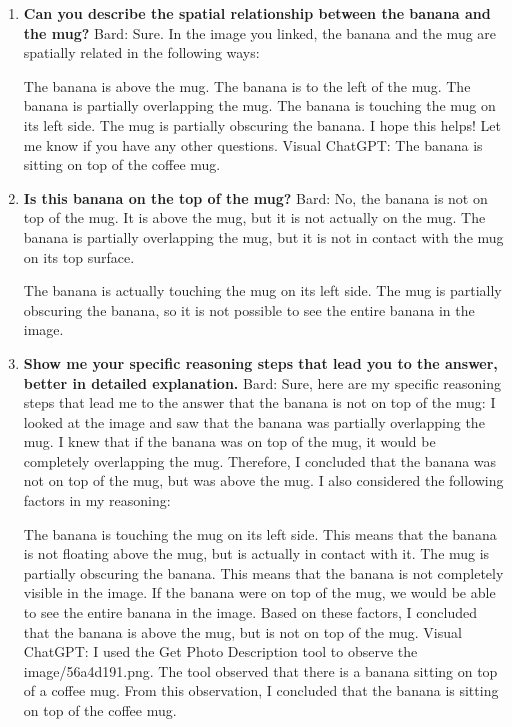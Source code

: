    \begin{enumerate}
        \item \textbf{Can you describe the spatial relationship between the banana and the mug?}
        \subitem Bard: Sure. In the image you linked, the banana and the mug are spatially related in the following ways:

        The banana is above the mug.
        The banana is to the left of the mug.
        The banana is partially overlapping the mug.
        The banana is touching the mug on its left side.
        The mug is partially obscuring the banana.
        I hope this helps! Let me know if you have any other questions.
        \subitem Visual ChatGPT: The banana is sitting on top of the coffee mug.
        \item \textbf{Is this banana on the top of the mug?}
        \subitem Bard: 
        No, the banana is not on top of the mug. It is above the mug, but it is not actually on the mug. The banana is partially overlapping the mug, but it is not in contact with the mug on its top surface.
        
        The banana is actually touching the mug on its left side. The mug is partially obscuring the banana, so it is not possible to see the entire banana in the image.
        \item \textbf{Show me your specific reasoning steps that lead you to the answer, better in detailed explanation.}
        \subitem Bard: 
        Sure, here are my specific reasoning steps that lead me to the answer that the banana is not on top of the mug:
        I looked at the image and saw that the banana was partially overlapping the mug.
        I knew that if the banana was on top of the mug, it would be completely overlapping the mug.
        Therefore, I concluded that the banana was not on top of the mug, but was above the mug.
        I also considered the following factors in my reasoning:

        The banana is touching the mug on its left side. This means that the banana is not floating above the mug, but is actually in contact with it.
        The mug is partially obscuring the banana. This means that the banana is not completely visible in the image. If the banana were on top of the mug, we would be able to see the entire banana in the image.
        Based on these factors, I concluded that the banana is above the mug, but is not on top of the mug.
        \subitem Visual ChatGPT: I used the Get Photo Description tool to observe the image/56a4d191.png. The tool observed that there is a banana sitting on top of a coffee mug. From this observation, I concluded that the banana is sitting on top of the coffee mug.
    \end{enumerate}
